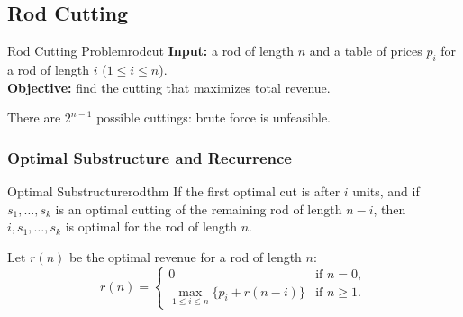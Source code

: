 \subsection{Rod Cutting}

\begin{definition}{Rod Cutting Problem}{rodcut}
\textbf{Input:} a rod of length $n$ and a table of prices $p_i$ for a rod of 
length $i$ ($1 \le i \le n$). \\
\textbf{Objective:} find the cutting that maximizes total revenue.
\end{definition}

There are $2^{n-1}$ possible cuttings: brute force is unfeasible.

\subsubsection{Optimal Substructure and Recurrence}

\begin{theorem}{Optimal Substructure}{rodthm}
If the first optimal cut is after $i$ units, and if
$s_1, \ldots, s_k$ is an optimal cutting of the remaining rod of length $n-i$,
then $i, s_1, \ldots, s_k$ is optimal for the rod of length $n$.
\end{theorem}

Let $r(n)$ be the optimal revenue for a rod of length $n$:
\[
  r(n) =
  \begin{cases}
    0 & \text{if } n = 0, \\
    \displaystyle\max_{1 \le i \le n} \bigl\{ p_i + r(n-i) \bigr\} & \text{if } n \ge 1.
  \end{cases}
\]

\begin{center}
\end{center}

